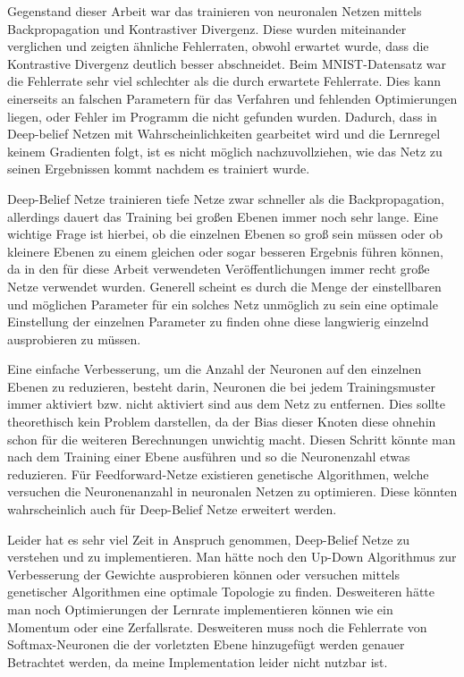 \documentclass[12pt]{article}
\begin{document}
Gegenstand dieser Arbeit war das trainieren von neuronalen Netzen mittels Backpropagation und Kontrastiver Divergenz. Diese wurden miteinander verglichen und zeigten ähnliche Fehlerraten, obwohl erwartet wurde, dass die Kontrastive Divergenz deutlich besser abschneidet. Beim MNIST-Datensatz war die Fehlerrate sehr viel schlechter als die durch \cite{learning} erwartete Fehlerrate. Dies kann einerseits an falschen Parametern für das Verfahren und fehlenden Optimierungen liegen, oder Fehler im Programm die nicht gefunden wurden. Dadurch, dass in Deep-belief Netzen mit Wahrscheinlichkeiten gearbeitet wird und die Lernregel keinem Gradienten folgt, ist es nicht möglich nachzuvollziehen, wie das Netz zu seinen Ergebnissen kommt nachdem es trainiert wurde.

Deep-Belief Netze trainieren tiefe Netze zwar schneller als die Backpropagation, allerdings dauert das Training bei großen Ebenen immer noch sehr lange. Eine wichtige Frage ist hierbei, ob die einzelnen Ebenen so groß sein müssen oder ob kleinere Ebenen zu einem gleichen oder sogar besseren Ergebnis führen können, da in den für diese Arbeit verwendeten Veröffentlichungen immer recht große Netze verwendet wurden. Generell scheint es durch die Menge der einstellbaren und möglichen Parameter für ein solches Netz unmöglich zu sein eine optimale Einstellung der einzelnen Parameter zu finden ohne diese langwierig einzelnd ausprobieren zu müssen. 

Eine einfache Verbesserung, um die Anzahl der Neuronen auf den einzelnen Ebenen zu reduzieren, besteht darin, Neuronen die bei jedem Trainingsmuster immer aktiviert bzw. nicht aktiviert sind aus dem Netz zu entfernen. Dies sollte theorethisch kein Problem darstellen, da der Bias dieser Knoten diese ohnehin schon für die weiteren Berechnungen unwichtig macht. Diesen Schritt könnte man nach dem Training einer Ebene ausführen und so die Neuronenzahl etwas reduzieren. Für Feedforward-Netze existieren genetische Algorithmen, welche versuchen die Neuronenanzahl in neuronalen Netzen zu optimieren. Diese könnten wahrscheinlich auch für Deep-Belief Netze erweitert werden. 

Leider hat es sehr viel Zeit in Anspruch genommen, Deep-Belief Netze zu verstehen und zu implementieren. Man hätte noch den Up-Down Algorithmus \cite{learning} zur Verbesserung der Gewichte ausprobieren können oder versuchen mittels genetischer Algorithmen eine optimale Topologie zu finden. Desweiteren hätte man noch Optimierungen der Lernrate implementieren können wie ein Momentum oder eine Zerfallsrate. Desweiteren muss noch die Fehlerrate von Softmax-Neuronen die der vorletzten Ebene hinzugefügt werden genauer Betrachtet werden, da meine Implementation leider nicht nutzbar ist.
\end{document}
